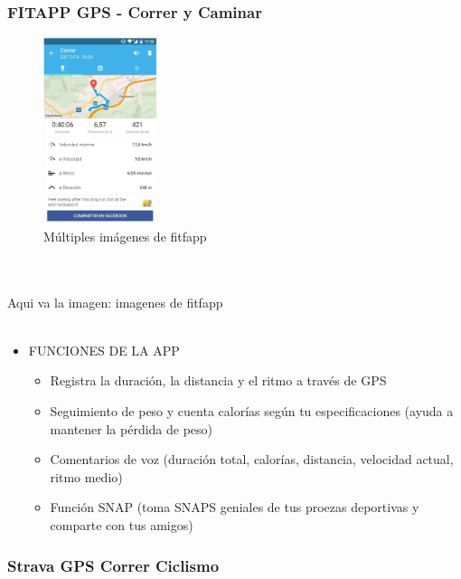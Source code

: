 \documentclass[a4paper, 11pt]{article}
\begin{document}
          \subsubsection{FITAPP GPS - Correr y Caminar}
              \begin{figure}[H]
                  \centering
                    \includegraphics[width=0.3\textwidth]{fitfapp}
                    \caption{Múltiples imágenes de fitfapp}
                    \label{f:fitfapp}
                \end{figure}
                \\\\\textcolor[rgb]{1,0,0}{Aqui va la imagen: imagenes de fitfapp}\\\\
                  \begin{itemize}
                    \item{FUNCIONES DE LA APP}
                    \begin{itemize}
                      \item {Registra la duración, la distancia y el ritmo a través de GPS}
                      \item {Seguimiento de peso y cuenta calorías según tu especificaciones (ayuda a mantener la pérdida de peso)}
                      \item {Comentarios de voz (duración total, calorías, distancia, velocidad actual, ritmo medio)}
                      \item {Función SNAP (toma SNAPS geniales de tus proezas deportivas y comparte con tus amigos)}
                    \end{itemize}
                  \end{itemize}

          \subsubsection{Strava GPS Correr Ciclismo}
\end{document}
